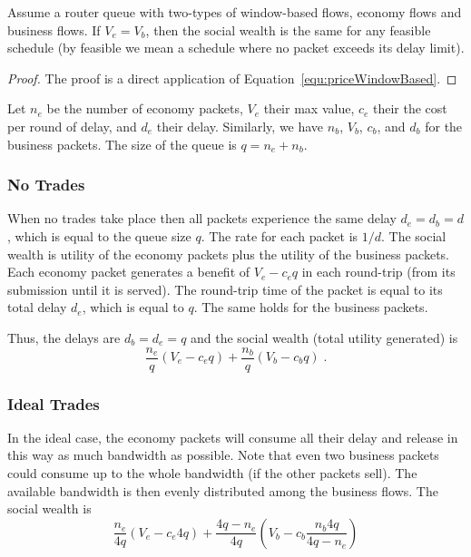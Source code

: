 \documentclass[letterpaper,10pt]{llncs}
\begin{document}
\begin{lemma}
\label{lem:SocialWealthEqualVmax}
Assume a router queue with two-types of window-based flows, economy flows and business flows. 
If $V_e = V_b$, then the social wealth is the same for any feasible schedule (by feasible we mean 
a schedule where no packet exceeds its delay limit).
\end{lemma}

\begin{proof}
The proof is a direct application of Equation~\ref{equ:priceWindowBased}.
\end{proof}

Let $n_e$ be the number of economy packets, $V_e$ their max value, $c_e$ their the cost per round of delay, and $d_e$ their delay. Similarly, we have $n_b$, $V_b$, $c_b$, and $d_b$ for the business packets.
The size of the queue is $q = n_e + n_b$. 

\subsubsection{No Trades}
When no trades take place then all packets experience the same delay $d_e=d_b=d$, which is equal to the
queue size $q$. The rate for each packet is $1/d$.
The social wealth is utility of the economy packets plus the utility of the business packets.
Each economy packet generates a benefit of $V_e-c_e q$ in each round-trip (from its submission until it is served). The round-trip time of the packet is equal to its total delay $d_e$, which is equal to $q$. The same holds for the business packets. 

Thus, the delays are $d_b = d_e = q$ and the social wealth (total utility generated) is 
\begin{equation}
\frac{n_e}{q}(V_e-c_e q) + \frac{n_b}{q}(V_b-c_b q) \; .
\end{equation}

\subsubsection{Ideal Trades}
In the ideal case, the economy packets will consume all their delay and release in this way 
as much bandwidth as possible. Note that even two business packets could consume up to the
whole bandwidth (if the other packets sell).
The available bandwidth is then evenly distributed among the 
business flows.
The social wealth is 
\begin{equation}
\frac{n_e}{4q}(V_e-c_e 4q) + \frac{4q-n_e}{4q}(V_b-c_b \frac{n_b 4 q}{4q - n_e})
\end{equation}
\end{document}
